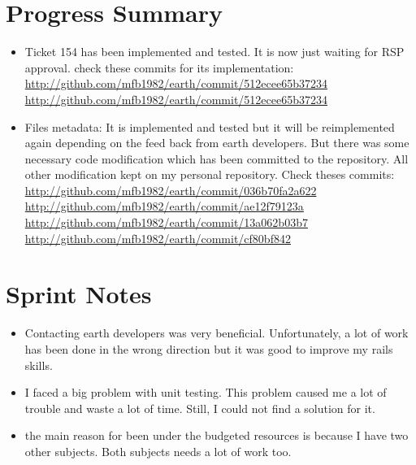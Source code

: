 \documentclass[a4paper,12pt]{article}
\begin{document}
\newpage

\section*{Progress Summary}
\begin{itemize}
   \item Ticket 154 has been implemented and tested. It is now just waiting for RSP approval. check these commits for its implementation: \\ 
\href{http://github.com/mfb1982/earth/commit/512ecee65b37234}{http://github.com/mfb1982/earth/commit/512ecee65b37234} \\
\href{http://github.com/mfb1982/earth/commit/d2fddc5b66b9530e}{http://github.com/mfb1982/earth/commit/512ecee65b37234} \\
	\item Files metadata: It is implemented and tested but it will be reimplemented again depending on the feed back from earth developers. But there was some necessary code modification which has been committed to the repository. All other modification kept on my personal repository.
Check theses commits:\\
\href{http://github.com/mfb1982/earth/commit/036b70fa2a622}{http://github.com/mfb1982/earth/commit/036b70fa2a622}\\
\href{http://github.com/mfb1982/earth/commit/ae12f79123a}{http://github.com/mfb1982/earth/commit/ae12f79123a}\\
\href{http://github.com/mfb1982/earth/commit/13a062b03b7}{http://github.com/mfb1982/earth/commit/13a062b03b7}\\
\href{http://github.com/mfb1982/earth/commit/cf80bf842}{http://github.com/mfb1982/earth/commit/cf80bf842}\\

\end{itemize}
\section*{Sprint Notes}
\begin{itemize}
	\item Contacting earth developers was very beneficial. Unfortunately, a lot of work has been done in the wrong direction but it was good to improve my rails skills.
	\item I faced a big problem with unit testing. This problem caused me a lot of trouble and waste a lot of time. Still, I could not find a solution for it.
	\item the main reason for been under the budgeted resources is because I have two other subjects. Both subjects needs a lot of work too. 
\end{itemize}
\end{document}
